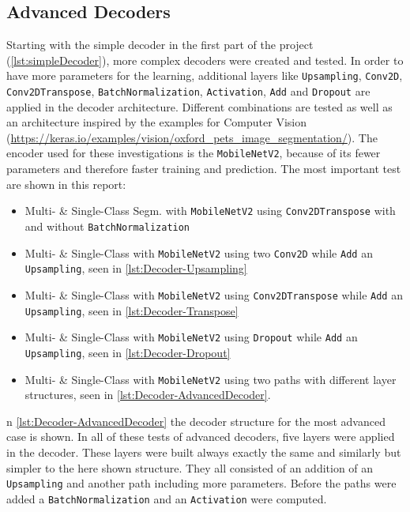 \subsection{Advanced Decoders}
Starting with the simple decoder in the first part of the project (\cref{lst:simpleDecoder}), more complex decoders were created and tested. In order to have more parameters for the learning, additional layers like \verb|Upsampling|, \verb|Conv2D|, \verb|Conv2DTranspose|, \verb|BatchNormalization|, \verb|Activation|, \verb|Add| and \verb|Dropout| are applied in the decoder architecture. Different combinations are tested as well as an architecture inspired by the examples for Computer Vision (\url{https://keras.io/examples/vision/oxford_pets_image_segmentation/}). The encoder used for these investigations is the \verb|MobileNetV2|, because of its fewer parameters and therefore faster training and prediction. The most important test are shown in this report:\\

    \begin{itemize}
    \item Multi- \& Single-Class Segm. with \verb|MobileNetV2| using
    \verb|Conv2DTranspose| with and without \verb|BatchNormalization|
    \item Multi- \& Single-Class with \verb|MobileNetV2| using
    two \verb|Conv2D| while \verb|Add| an \verb|Upsampling|, seen in \cref{lst:Decoder-Upsampling}
    \item Multi- \& Single-Class with \verb|MobileNetV2| using
    \verb|Conv2DTranspose| while \verb|Add| an \verb|Upsampling|, seen in \cref{lst:Decoder-Transpose}
    \item Multi- \& Single-Class with \verb|MobileNetV2| using
    \verb|Dropout| while \verb|Add| an \verb|Upsampling|, seen in \cref{lst:Decoder-Dropout}
    \item Multi- \& Single-Class with \verb|MobileNetV2| using
    two paths with different layer structures, seen in \cref{lst:Decoder-AdvancedDecoder}.
    \end{itemize}
\vspace{1cm}
n \cref{lst:Decoder-AdvancedDecoder} the decoder structure for the most advanced case is shown. In all of these tests of advanced decoders, five layers were applied in the decoder. These layers were built always exactly the same and similarly but simpler to the here shown structure. They all consisted  of an addition of an \verb|Upsampling| and another path including more parameters. Before the paths were added a \verb|BatchNormalization| and an \verb|Activation| were computed.\\


